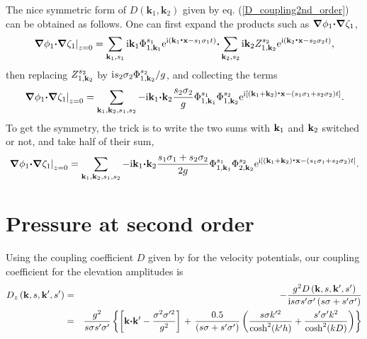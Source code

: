 The nice symmetric 
form of  $D\left({\mathbf k_1},{\mathbf k_2}\right)$ given by eq. (\ref{D_coupling2nd_order}) can be obtained as follows.  
One can first expand the products such as $\mbox{\boldmath $\nabla$}\phi_1 \mbox{\boldmath $\cdot$}\mbox{\boldmath $\nabla$} \zeta_1$,
\begin{equation}
    \left.\mbox{\boldmath $\nabla$}\phi_1 \mbox{\boldmath $\cdot$}\mbox{\boldmath $\nabla$} \zeta_1\right|_{z=0}=
\sum_{\mathbf{k}_1,s_1}
    \mathrm{i} \mathbf{k}_1 \Phi _{1,\mathbf{k}_1}^{s_1} \mathrm{e}^{\mathrm{i}
    \left(\mathbf{k}_1\mbox{\boldmath $\cdot$}{\mathbf x} - s_1 \sigma_1 t\right)} \mbox{\boldmath $\cdot$} \sum_{{\mathbf k_2},s_2}
     \mathrm{i} \mathbf{k}_2 Z _{1,\mathbf{k}_2}^{s_2} \mathrm{e}^{\mathrm{i}
    \left(\mathbf{k}_2\mbox{\boldmath $\cdot$}{\mathbf x} - s_2 \sigma_2 t\right)},
  \label{dotprod}
\end{equation}
then replacing $Z _{1,\mathbf{k}_2}^{s_2}$ by $\mathrm{i} s_2 \sigma_2 \Phi _{1,\mathbf{k}_2}^{s_2}/g$, and collecting the terms 
\begin{equation}
    \left.\mbox{\boldmath $\nabla$}\phi_1 \mbox{\boldmath $\cdot$}\mbox{\boldmath $\nabla$} \zeta_1\right|_{z=0}=
\sum_{\mathbf{k}_1,\mathbf{k}_2,s_1,s_2}
    -\mathrm{i} \mathbf{k}_1 \mbox{\boldmath $\cdot$} \mathbf{k}_2  \frac{s_2 \sigma_2}{g} \Phi _{1,\mathbf{k}_1}^{s_1} \Phi _{1,\mathbf{k}_2}^{s_2} \mathrm{e}^{\mathrm{i}
    \left[\left(\mathbf{k}_1+\mathbf{k}_2\right)\mbox{\boldmath $\cdot$}{\mathbf x} - \left(s_1 \sigma_1+s_2 \sigma_2\right) t\right]}
  \label{dotprod2}.
\end{equation}
To get the symmetry, the trick is to write the two sums with $\mathbf{k}_1$ and $\mathbf{k}_2$ switched or not, and take half 
of their sum, 
\begin{equation}
    \left.\mbox{\boldmath $\nabla$}\phi_1 \mbox{\boldmath $\cdot$}\mbox{\boldmath $\nabla$} \zeta_1\right|_{z=0}=
\sum_{\mathbf{k}_1,\mathbf{k}_2,s_1,s_2}
    -\mathrm{i} \mathbf{k}_1 \mbox{\boldmath $\cdot$} \mathbf{k}_2 \frac{s_1 \sigma_1 +  s_2 \sigma_2}{2g} \Phi _{1,\mathbf{k}_1}^{s_1} \Phi _{2,\mathbf{k}_2}^{s_2} \mathrm{e}^{\mathrm{i}
    \left[\left(\mathbf{k}_1+\mathbf{k}_2\right)\mbox{\boldmath $\cdot$}{\mathbf x} - \left(s_1 \sigma_1+s_2 \sigma_2\right) t\right]}.
  \label{dotprod3}
\end{equation}


\section{Pressure at second order}
Using the coupling coefficient $D$ given by \citet[][eq. 4.3]{Hasselmann1962} 
for the velocity potentials, our coupling coefficient for the elevation amplitudes is  
\begin{eqnarray}
  D_z\left(\mathbf{k},s,\mathbf{k^{\prime}},s'\right)& = & - \frac{ g^2 D \left(\mathbf{k},s,\mathbf{k^{\prime}},s'\right)  }{ \mathrm{i} s \sigma s'\sigma' \left(s \sigma+s' \sigma'\right) } 
  \nonumber \\
& =& \frac{g^2}{s \sigma s' \sigma'} \left\{  \left[\mathbf{k} \mbox{\boldmath $\cdot$} \mathbf{k^{\prime}} - \frac{ \sigma^2 \sigma'^2}{g^2}  \right] \right. 
   +\left. \frac{0.5}{ \left(s \sigma+s' \sigma'\right)} 
\left(\frac{s \sigma k'^2}{ \cosh^2(k'h)}+\frac{s' \sigma' k^2}{ \cosh^2(kD)}\right)\right\} \nonumber \\
\label{Dz}
\end{eqnarray}

